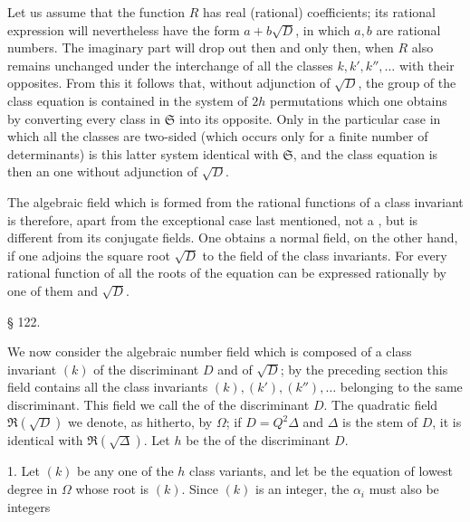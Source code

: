 

Let us assume that the function $R$ has real (rational) coefficients; its rational expression will nevertheless have the form $a+b\sqrt{D}$, in which $a, b$ are rational numbers. The imaginary part will drop out then and only then, when $R$ also remains unchanged under the interchange of all the classes $k, k', k'', \ldots$ with their opposites. From this it follows that, without adjunction of $\sqrt{D}$, the  group of the class equation is contained in the system of $2h$ permutations which one obtains by converting every class in $\mathfrak{S}$ into its opposite. Only in the particular case in which all the classes are two-sided (which occurs only for a finite number of determinants) is this latter system identical with $\mathfrak{S}$, and the class equation is then an  one without adjunction of $\sqrt{D}$.

The algebraic field which is formed from the rational functions of a class invariant is therefore, apart from the exceptional case last mentioned, not a , but is different from its conjugate fields. One obtains a normal field, on the other hand, if one adjoins the square root $\sqrt{D}$ to the field of the class invariants. For every rational function of all the roots of the equation can be expressed rationally by one of them and $\sqrt{D}$.

\begin{center}
§ 122. 
\end{center}

We now consider the algebraic number field
which is composed of a class invariant $(k)$ of the discriminant $D$ and of $\sqrt{D}$; by the preceding section this field contains all the class invariants $(k), (k'), (k''), \ldots$ belonging to the same discriminant. This field we call the  of the discriminant $D$. The quadratic field $\mathfrak{R}(\sqrt{D})$ we denote, as hitherto, by $\Omega$; if $D=Q^2\Delta$ and $\Delta$ is the stem of $D$, it is identical with $\mathfrak{R}(\sqrt{\Delta})$.
Let $h$ be the  of the discriminant $D$.

1. Let $(k)$ be any one of the $h$ class variants, and let %
be the equation of lowest degree in $\Omega$ whose root is $(k)$. Since $(k)$ is an integer, the $\alpha_i$ must also be integers

